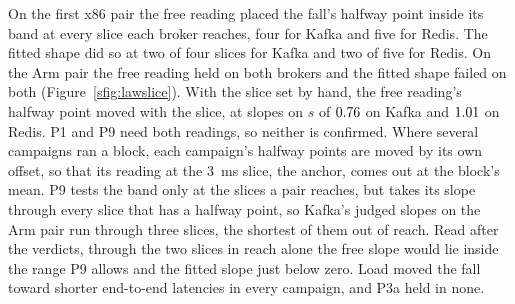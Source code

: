\documentclass[10pt,journal,onecolumn]{IEEEtran}
\newcommand{\kafka}{Kafka}
\newcommand{\redis}{Redis}
\begin{document}
On the first x86 pair the free reading placed the fall's halfway point inside its band at every
slice each broker reaches, four for \kafka{} and five for \redis{}. The fitted shape did so at two
of four slices for \kafka{} and two of five for \redis{}. On the Arm pair the free reading held on
both brokers and the fitted shape failed on both (Figure~\ref{sfig:lawslice}). With the slice set by hand, the free reading's halfway point moved with the slice, at slopes on $s$ of $0.76$ on \kafka{} and $1.01$ on \redis{}. P1 and P9 need both
readings, so neither is confirmed. Where several campaigns ran a block, each campaign's halfway
points are moved by its own offset, so that its reading at the 3~ms slice, the anchor, comes out
at the block's mean. P9 tests the band only at the slices a pair
reaches, but takes its slope through every slice that has a halfway point, so \kafka{}'s judged
slopes on the Arm pair run through three slices, the shortest of them out of reach. Read after the
verdicts, through the two slices in reach alone the free slope would lie inside the range P9 allows
and the fitted slope just below zero. Load moved the fall toward shorter end-to-end latencies in
every campaign, and P3a held in none.
\end{document}
